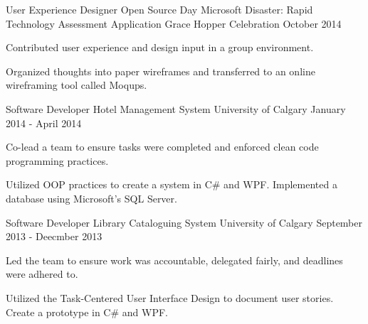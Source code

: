 \begin{cventries}
  \cventry
    {User Experience Designer}
    {Open Source Day Microsoft Disaster: Rapid Technology Assessment Application}
    {Grace Hopper Celebration}
    {October 2014}
    {
      \begin{cvitems}
        \item {Contributed user experience and design input in a group environment.}
        \item {Organized thoughts into paper wireframes and transferred to an online wireframing tool called Moqups.}
      \end{cvitems}
    }
  \cventry
    {Software Developer}
    {Hotel Management System}
    {University of Calgary}
    {January 2014 - April 2014}
    {
      \begin{cvitems}
        \item {Co-lead a team to ensure tasks were completed and enforced clean code programming practices.}
        \item {Utilized OOP practices to create a system in C\# and WPF. Implemented a database using Microsoft’s SQL Server.}
      \end{cvitems}
    }
  \cventry
    {Software Developer}
    {Library Cataloguing System}
    {University of Calgary}
    {September 2013 - Deecmber 2013}
    {
      \begin{cvitems}
        \item {Led the team to ensure work was accountable, delegated fairly, and deadlines were adhered to.}
        \item {Utilized the Task-Centered User Interface Design to document user stories. Create a prototype in C\# and WPF.}
      \end{cvitems} 
    }
\end{cventries}
